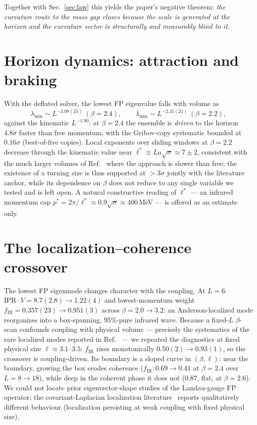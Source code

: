 \documentclass[11pt]{article}
\begin{document}
Together with Sec.~\ref{sec:law} this yields the paper's negative theorem: \emph{the
curvature route to the mass gap closes because the scale is generated at the horizon
\cite{Zwanziger} and the curvature sector is structurally and measurably blind to it.}

\section{Horizon dynamics: attraction and braking}\label{sec:dyn}
With the deflated solver, the lowest FP eigenvalue falls with volume as
\[
\lambda_{\min}\sim L^{-3.08(25)}\ (\beta=2.4),\qquad
\lambda_{\min}\sim L^{-2.31(21)}\ (\beta=2.2),
\]
against the kinematic $L^{-1.90}$: at $\beta=2.4$ the ensemble is \emph{driven} to the
horizon $4.8\sigma$ faster than free momentum, with the Gribov-copy systematic bounded at
$0.16\sigma$ (best-of-five copies). Local exponents over sliding windows at $\beta=2.2$
decrease through the kinematic value near $\ell^{*}\equiv L a\sqrt{\sigma}\approx7\pm2$,
consistent with the much larger volumes of Ref.~\cite{CucchieriMendes08} where the
approach is slower than free; the existence of a turning size is thus supported at
$>3\sigma$ jointly with the literature anchor, while its dependence on $\beta$ does not
reduce to any single variable we tested and is left open. A natural constructive reading
of $\ell^*$ --- an infrared momentum cap $p^{*}=2\pi/\ell^{*}\approx0.9\sqrt{\sigma}
\approx 400\,$MeV --- is offered as an estimate only.

\section{The localization--coherence crossover}\label{sec:cross}
The lowest FP eigenmode changes character with the coupling. At $L=6$:
$\mathrm{IPR}\!\cdot\!V = 8.7(2.8)\to1.22(4)$ and lowest-momentum weight
$f_{\mathrm{IR}}=0.357(23)\to0.951(3)$ across $\beta=2.0\to3.2$: an Anderson-localized
mode reorganizes into a box-spanning, $95\%$-pure infrared wave. Because a fixed-$L$
$\beta$-scan confounds coupling with physical volume --- precisely the systematics of the
rare localized modes reported in Ref.~\cite{Sternbeck05} --- we repeated the diagnostics
at fixed physical size $\ell\approx3.1$--$3.5$: $f_{\mathrm{IR}}$ rises monotonically
$0.50(2)\to0.93(1)$, so the crossover is coupling-driven. Its boundary is a sloped curve
in $(\beta,\ell)$: near the boundary, growing the box erodes coherence
($f_{\mathrm{IR}}:0.69\to0.41$ at $\beta=2.4$ over $L=8\to18$), while deep in the
coherent phase it does not ($0.87$, flat, at $\beta=2.6$). We could not locate prior
eigenvector-shape studies of the Landau-gauge FP operator; the covariant-Laplacian
localization literature~\cite{Greensite05} reports qualitatively different behaviour
(localization persisting at weak coupling with fixed physical size).
\end{document}
